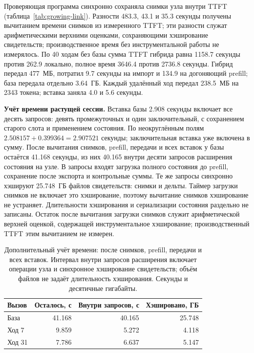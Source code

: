 Проверяющая программа синхронно сохраняла снимки узла внутри TTFT (таблица~\ref{tab:growing-link}).
Разности 483.3, 43.1 и 35.3 секунды получены вычитанием времени снимков из измеренного TTFT;
эти разности служат арифметическими верхними оценками, сохраняющими хэширование свидетельств;
производственное время без инструментальной работы не измерялось.
По 40 ходам без базы сумма TTFT гибрида равна 1158.7 секунды против 262.9 локально,
полное время 3646.4 против 2736.8 секунды. Гибрид передал 477~МБ, потратил 9.7 секунды
на импорт и 134.9 на догоняющий prefill; база передала отдельно 3.64~ГБ. Каждый удалённый ход передал 238.5~МБ на 2343 токена; вставка заняла 4.0 и 5.6 секунды.

\textbf{Учёт времени растущей сессии.} Вставка базы 2.908 секунды включает все десять запросов:
девять промежуточных и один заключительный, с сохранением старого слота и применением состояния.
По неокруглённым полям $2.508157+0.399364=2.907521$ секунды; заключительная вставка уже включена в сумму.
После вычитания снимков, prefill, передачи и всех вставок у базы остаётся 41.168 секунды,
из них 40.165 внутри десяти запросов расширения состояния на узле.
В запросы входят загрузка полного состояния до prefill, сохранение после экспорта и контрольные суммы.
Те же запросы синхронно хэшируют 25.748~ГБ файлов свидетельств: снимки и дельты.
Таймер загрузки снимков не включает это хэширование, поэтому вычитание снимков хэширование не устраняет.
Длительности хэширования и сериализации состояния раздельно не записаны.
Остаток после вычитания загрузки снимков служит арифметической верхней оценкой, содержащей инструментальное
хэширование; производственный TTFT этим вычитанием не измерен.

\begin{table}[t]
\centering
\caption{Дополнительный учёт времени: после снимков, prefill, передачи и всех вставок.
Интервал внутри запросов расширения включает операции узла и синхронное хэширование свидетельств;
объём файлов не задаёт длительность хэширования. Секунды и десятичные гигабайты.}
\label{tab:time-accounting}
\footnotesize
\begin{tabular}{lrrr}
\toprule
Вызов & Осталось, с & Внутри запросов, с & Хэшировано, ГБ \\
\midrule
База & 41.168 & 40.165 & 25.748 \\
Ход 7 & 9.859 & 5.272 & 4.118 \\
Ход 31 & 7.786 & 6.637 & 5.147 \\
\bottomrule
\end{tabular}
\end{table}

